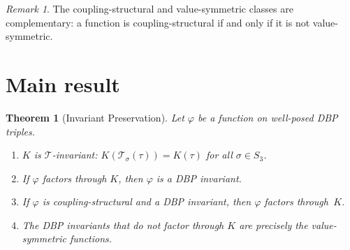 \documentclass[12pt,a4paper]{article}
\theoremstyle{definition}
\theoremstyle{plain}
\newtheorem{theorem}{Theorem}
\theoremstyle{remark}
\newtheorem{remark}{Remark}
\newcommand{\T}{\mathcal{T}}
\begin{document}
\begin{remark}
The coupling-structural and value-symmetric classes are complementary: a function is coupling-structural if and only if it is not value-symmetric.
\end{remark}


\section{Main result}

\begin{theorem}[Invariant Preservation]\label{thm:main}
Let $\varphi$ be a function on well-posed DBP triples.
\begin{enumerate}[label=(\roman*)]
\item $K$ is $\T$-invariant: $K(\T_\sigma(\tau)) = K(\tau)$ for all $\sigma \in S_3$.
\item If $\varphi$ factors through $K$, then $\varphi$ is a DBP invariant.
\item If $\varphi$ is coupling-structural and a DBP invariant, then $\varphi$ factors through~$K$.
\item The DBP invariants that do not factor through $K$ are precisely the value-symmetric functions.
\end{enumerate}
\end{theorem}
\end{document}
